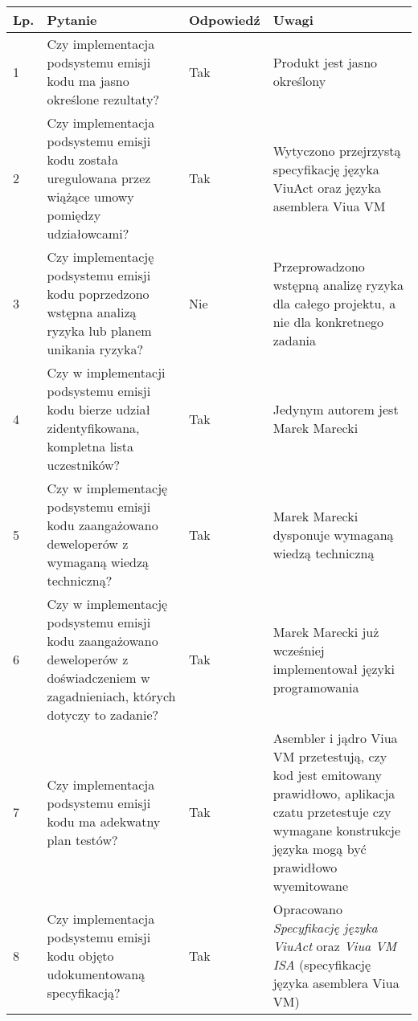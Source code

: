 \documentclass[11pt,oneside,a4paper,titlepage,onecolumn]{article}
\begin{document}
\begin{tabularx}{\textwidth}{|l|X|l|X|}
	\hline
	
	\hline
    Lp. & Pytanie & Odpowiedź & Uwagi \\ \hline
    
    1 
    & Czy implementacja podsystemu emisji kodu ma jasno określone 
    rezultaty?
    & Tak
    & Produkt jest jasno określony
    \\\hline

    2
	& Czy implementacja podsystemu emisji kodu została uregulowana
	przez wiążące umowy pomiędzy udziałowcami?
	& Tak
	& Wytyczono przejrzystą specyfikację języka ViuAct oraz języka
	asemblera Viua VM
	\\\hline	
	
	3
	& Czy implementację podsystemu emisji kodu poprzedzono wstępna
	analizą	ryzyka lub planem unikania ryzyka?
	& Nie
	& Przeprowadzono wstępną analizę ryzyka dla całego projektu, a
	nie dla konkretnego zadania
	\\\hline
	
	4
	& Czy w implementacji podsystemu emisji kodu bierze udział 
	zidentyfikowana, kompletna lista uczestników?
	& Tak
	& Jedynym autorem jest Marek Marecki
	\\\hline

	5
	& Czy w implementację podsystemu emisji kodu zaangażowano
	deweloperów z wymaganą wiedzą techniczną?
	& Tak
	& Marek Marecki dysponuje wymaganą wiedzą techniczną
	\\\hline
	
	6
	& Czy w implementację podsystemu emisji kodu zaangażowano
	deweloperów z doświadczeniem w zagadnieniach, których dotyczy 
	to zadanie?
	& Tak
	& Marek Marecki już wcześniej implementował języki programowania
	\\\hline

	7
	& Czy implementacja podsystemu emisji kodu ma adekwatny plan
	testów?
	& Tak
	& Asembler i jądro Viua VM przetestują, czy kod jest emitowany
	prawidłowo, aplikacja czatu przetestuje czy wymagane konstrukcje
	języka mogą być prawidłowo wyemitowane
	\\\hline	
	
	8
	& Czy implementacja podsystemu emisji kodu objęto udokumentowaną
	specyfikacją?
	& Tak
	& Opracowano \textit{Specyfikację języka ViuAct} oraz 
	\textit{Viua VM ISA} (specyfikację języka asemblera Viua VM)
	\\\hline
	
\end{tabularx}
	
\end{document}
